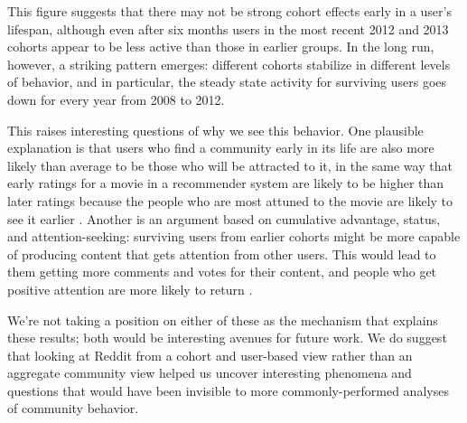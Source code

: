 This figure suggests that there may not be strong cohort effects early in a user's lifespan, although even after six months users in the most recent 2012 and 2013 cohorts appear to be less active than those in earlier groups.  In the long run, however, a striking pattern emerges: different cohorts stabilize in different levels of behavior, and in particular, the steady state activity for surviving users goes down for every year from 2008 to 2012.  

This raises interesting questions of why we see this behavior.  One plausible explanation is that users who find a community early in its life are also more likely than average to be those who will be attracted to it, in the same way that early ratings for a movie in a recommender system are likely to be higher than later ratings because the people who are most attuned to the movie are likely to see it earlier \cite{if_we_can_find_one}.  Another is an argument based on cumulative advantage, status, and attention-seeking: surviving users from earlier cohorts might be more capable of producing content that gets attention from other users.  This would lead to them getting more comments and votes for their content, and people who get positive attention are more likely to return \cite{joyce-kraut, wikipedia, everything2_papers}.  

We're not taking a position on either of these as the mechanism that explains these results; both would be interesting avenues for future work.  We do suggest that looking at Reddit from a cohort and user-based view rather than an aggregate community view helped us uncover interesting phenomena and questions that would have been invisible to more commonly-performed analyses of community behavior. 


